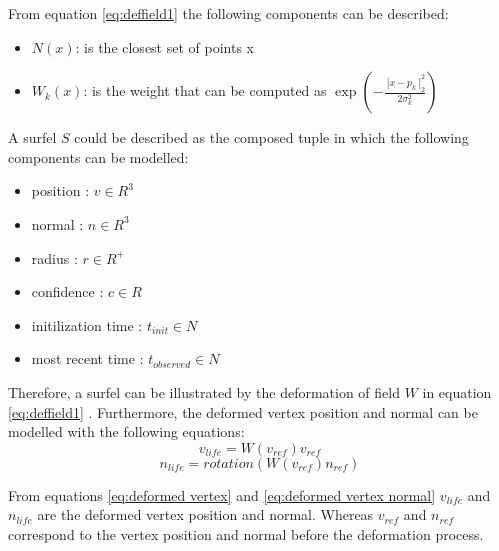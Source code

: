 \documentclass[12pt]{report}
\begin{document}
From equation \ref{eq:deffield1} the following components can be described:
\begin{itemize}
  \item $N(x)$: is the closest set of points x
  \item $W_{k}(x)$:  is the weight that can be computed as $\exp{(-\frac{\ | {x-p_k} \ |^{2}_2 }{2\sigma^{2}_k})}$
\end{itemize}

A surfel $S$ could be described as the composed tuple in which the following components can be modelled:
\begin{itemize}
  \item position : $v \in R^3$ 
  \item  normal  : $n \in R^3$
  \item  radius : $r \in R^+$
  \item confidence : $c \in R$
  \item initilization time : $t_{init} \in N$
  \item most recent time : $t_{observed} \in N$ 
\end{itemize}
Therefore, a surfel can be illustrated by the deformation of field $W$ in equation \ref{eq:deffield1} \citep{SurfelWarp}.
Furthermore, the deformed vertex position  and normal can be modelled with the following equations:
\begin{equation}
  v_{life}=W(v_{ref})v_{ref}
  \label{eq:deformed vertex}
\end{equation}
\begin{equation}
  n_{life}=rotation(W(v_{ref})n_{ref})
  \label{eq:deformed vertex normal}
\end{equation}

From equations \ref{eq:deformed vertex} and \ref{eq:deformed vertex normal} $v_{life}$ and $n_{life}$ are the deformed vertex position and normal.
Whereas $v_{ref}$ and $n_{ref}$ correspond to the vertex position and normal before the deformation process. 
\end{document}
